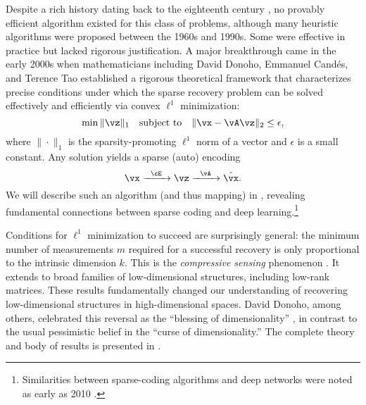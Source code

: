 \documentclass[../../book-main.tex]{subfiles}
\begin{document}
Despite a rich history dating back to the eighteenth century \cite{Boscovichca1750}, no provably efficient algorithm existed for this class of problems, although many heuristic algorithms were proposed between the 1960s and 1990s. Some were effective in practice but lacked rigorous justification. A major breakthrough came in the early 2000s when mathematicians including David Donoho, Emmanuel Cand\'{e}s, and Terence Tao \cite{donoho2005neighborly,Candes2005,CandesE2005-IT} established a rigorous theoretical framework that characterizes precise conditions under which the sparse recovery problem can be solved effectively and efficiently via convex \(\ell^{1}\) minimization:
\begin{equation}
    \min \|\vz\|_{1} \quad \text{subject to} \quad \|\vx - \vA\vz\|_{2} \le \epsilon,
\end{equation}
where \(\|\cdot\|_{1}\) is the sparsity-promoting \(\ell^{1}\) norm of a vector and \(\epsilon\) is a small constant. Any solution yields a sparse (auto) encoding 
\begin{equation}
    \vx \xrightarrow{\hspace{2mm} \cE \hspace{2mm}} \vz \xrightarrow{\hspace{2mm} \vA \hspace{2mm}} \hat{\vx}.
    \label{eqn:decoding-sparse}
\end{equation}
We will describe such an algorithm (and thus mapping) in , revealing fundamental connections between sparse coding and deep learning.\footnote{Similarities between sparse-coding algorithms and deep networks were noted as early as 2010 \cite{gregor2010learning}.}

Conditions for \(\ell^{1}\) minimization to succeed are surprisingly general: the minimum number of measurements \(m\) required for a successful recovery is only proportional to the intrinsic dimension \(k\). This is the \textit{compressive sensing} phenomenon \cite{CandesE2006-ICM}. It extends to broad families of low-dimensional structures, including low-rank matrices. These results fundamentally changed our understanding of recovering low-dimensional structures in high-dimensional spaces. David Donoho, among others, celebrated this reversal as the ``blessing of dimensionality'' \cite{DonohoD2000}, in contrast to the usual pessimistic belief in the ``curse of dimensionality.'' The complete theory and body of results is presented in \cite{Wright-Ma-2022}.
\end{document}
